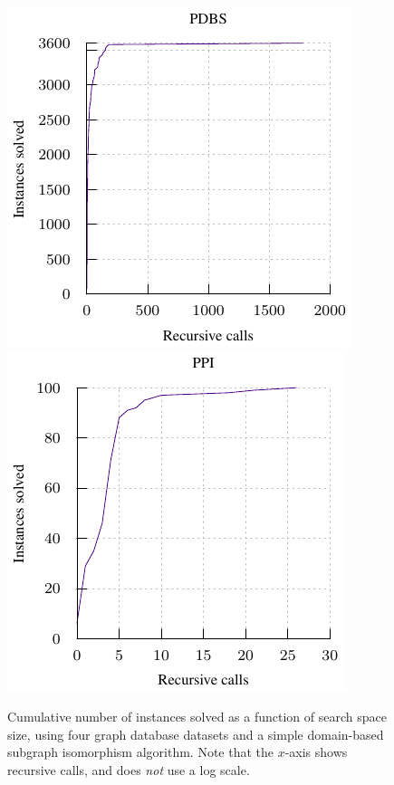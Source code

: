 \documentclass[twoside,11pt]{article}
\begin{document}
\begin{figure}[t]
    \centering
    \hspace*{1em}
    \includegraphics*{plots/biiiig-data-pdbs.pdf}
    \hfill
    \includegraphics*{plots/biiiig-data-ppigo.pdf}
    \hspace*{1em}

    \caption{Cumulative number of instances solved as a function of search space size, using four
    graph database datasets and a simple domain-based subgraph isomorphism algorithm. Note that the
    $x$-axis shows recursive calls, and does \emph{not} use a log scale.}
    \label{figure:biiiig-data}
\end{figure}
\end{document}
